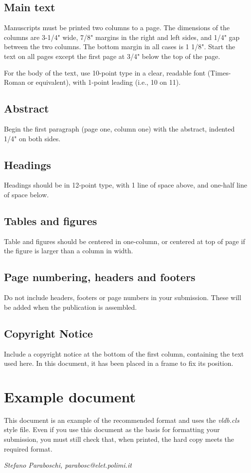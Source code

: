 \documentclass{vldb}
\begin{document}
\subsection{Main text}

Manuscripts must be printed two columns to a page.  The dimensions of
the columns are 3-1/4" wide, 7/8" margins in the right and left sides,
and 1/4" gap between the two columns.  The bottom margin in all cases
is 1 1/8". Start the text on all pages except the first page at 3/4"
below the top of the page.  

For the body of the text, use 10-point type in a clear, readable font
(Times-Roman or equivalent), with 1-point leading (i.e., 10 on 11).

\subsection{Abstract}

Begin the first paragraph (page one, column one) with the abstract,
indented 1/4" on both sides.

\subsection{Headings}

Headings should be in 12-point type, with 1 line of space above, and
one-half line of space below.

\subsection{Tables and figures}

Table and figures should be centered in one-column, or centered at top
of page if the figure is larger than a column in width.


\subsection{Page numbering, headers and footers}

Do not include headers, footers or page numbers in your
submission. These will be added when the publication is assembled.

\subsection{Copyright Notice}

Include a copyright notice at the bottom of the first column,
containing the text used here. In this document, it has been placed in
a frame to fix its position.

\section{Example document}

This document is an example of the recommended format and uses the
{\em vldb.cls} style file.  Even if you use this document as the basis
for formatting your submission, you must still check that, when
printed, the hard copy meets the required format.


\bigskip

{\em Stefano Paraboschi, parabosc@elet.polimi.it}
\end{document}
